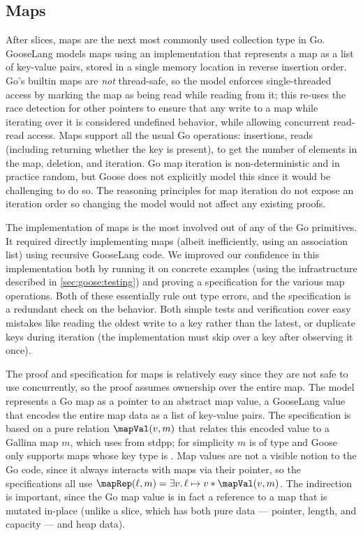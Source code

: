 \subsection{Maps}


After slices, maps are the next most commonly used collection type in
Go. GooseLang models maps using an implementation that represents a map as a
list of key-value pairs, stored in a single memory location in reverse insertion
order. Go's builtin maps are
\emph{not} thread-safe, so the model enforces single-threaded access by
marking the map as being read while reading from it; this re-uses the
race detection for other pointers to ensure that any write to a map while iterating
over it is considered
undefined behavior, while allowing concurrent read-read access. Maps
support all the usual Go operations: insertions, reads (including returning
whether the key is present),  to get the number of elements
in the map, deletion, and iteration. Go map iteration is
non-deterministic and in practice random, but Goose does not explicitly model this
since it would be challenging to do so. The reasoning
principles for map iteration do not expose an iteration order so changing the
model would not affect any existing proofs.

The implementation of maps is the most involved out of any of the Go
primitives. It required directly implementing maps (albeit
inefficiently, using an association list) using recursive GooseLang
code. We improved our confidence in this
implementation both by running it on concrete examples (using the infrastructure
described in \cref{sec:goose:testing}) and proving a specification for the
various map operations. Both of these
essentially rule out type errors,
and the specification is a redundant check on the behavior. Both simple tests and verification
cover easy mistakes like reading the oldest write to a key rather than
the latest, or duplicate keys during iteration (the implementation must
skip over a key after observing it once).

The proof and specification for maps is relatively easy since they are
not safe to use concurrently, so the proof assumes ownership over the entire
map. The model represents
a Go map as a pointer to an abstract map value, a GooseLang value
that encodes the entire map data as a list of key-value pairs. The
specification is based on a pure relation $\mapVal(v, m)$ that relates
this encoded value to a Gallina map $m$, which uses  from
stdpp; for simplicity $m$ is of type  and Goose only supports
maps whose key type is .
Map values are not a visible notion to the Go code, since
it always interacts with maps via their pointer, so the specifications
all use $\mapRep(\ell, m) = \exists v.\, \ell \mapsto v * \mapVal(v, m)$. The
indirection is important, since the Go map value
 is in fact a reference to a map that is
mutated in-place (unlike a slice, which has both pure data --- pointer,
length, and capacity --- and heap data).

